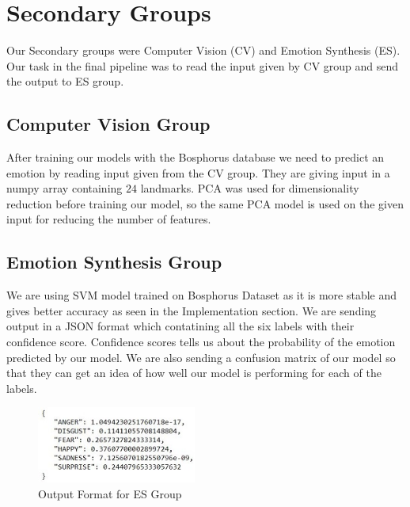 \section{Secondary Groups}

Our Secondary groups were Computer Vision (CV) and Emotion Synthesis (ES). Our task in the final pipeline was to read the input given by CV group and send the output to ES group.

\subsection{Computer Vision Group}
After training our models with the Bosphorus database we need to predict an emotion by reading input given from the CV group. They are giving input in a numpy array containing $24$ landmarks. PCA was used for dimensionality reduction before training our model, so the same PCA model is used on the given input for reducing the number of features. 

\subsection{Emotion Synthesis Group}
We are using SVM model trained on Bosphorus Dataset as it is more stable and gives better accuracy as seen in the Implementation section. We are sending output in a JSON format which contatining all the six labels with their confidence score. Confidence scores tells us about the probability of the emotion predicted by our model. We are also sending a confusion matrix of our model so that they can get an idea of how well our model is performing for each of the labels.


\begin{figure}[H]
    \centering
    \includegraphics[height= 25mm]{figures/emotion_output.jpg}
    \caption{Output Format for ES Group}
    \label{emotion_output}
\end{figure}


